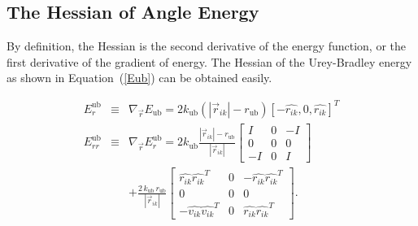 \documentclass[11pt]{article}
\newcommand{\hatr}[1]{\mbox{$\hat{{r}_{#1}}$}}
\newcommand{\hatv}[1]{\mbox{$\hat{{v}_{#1}}$}}
\newcommand{\AbsVr}[1]{\mbox{$\left| \vec{r}_{#1} \right| $}}
\begin{document}
\subsection{The Hessian of Angle Energy}
By definition, the Hessian is the second
derivative of the energy function, or the first derivative 
of the gradient of energy. The Hessian of the Urey-Bradley energy as
shown in Equation~(\ref{Eub}) can be obtained easily.

\begin{eqnarray}
  E^{\mathrm{ub}}_r  &\equiv& \nabla_{\vec{r}}E_{\mathrm{ub}} =  2 k_{\mathrm{ub}} \left(
\AbsVr{ik} - r_{\mathrm{ub}} \right) [-\hatr{ik}, 0, \hatr{ik}]^T \\
  E^{\mathrm{ub}}_{rr}  &\equiv& \nabla_{\vec{r}}E^{\mathrm{ub}}_r 
= 2 k_{\mathrm{ub}} \frac{\AbsVr{ik} - r_{\mathrm{ub}}}{\AbsVr{ik}}
\left[ \begin{array}{ccc}
I & 0 & -I\\
0 & 0 & 0\\
-I & 0& I
\end{array}
\right] \nonumber \\ 
& & + \frac{2 \,k_{\mathrm{ub}}\, r_{\mathrm{ub}}}{\AbsVr{ik}}
\left[ \begin{array}{ccc}
\hatr{ik}\hatr{ik}^T & 0 & -\hatr{ik}\hatr{ik}^T\\
0 & 0 & 0\\ 
-\hatv{ik}\hatv{ik}^T & 0& \hatr{ik}\hatr{ik}^T
\end{array}
\right].
\end{eqnarray}
\end{document}
